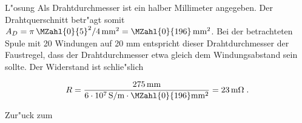 \begin{MExercises}
\begin{MExercise}
\begin{MHint}{L"osung}
Als Drahtdurchmesser ist ein halber Millimeter angegeben. Der Drahtquerschnitt betr"agt somit $A_D=\pi\,\MZahl{0}{5}^2/4\,\text{mm}^2=\MZahl{0}{196}\,\text{mm}^2 $. Bei der betrachteten Spule mit 20 Windungen auf 20 mm entspricht dieser Drahtdurchmesser der Faustregel, dass der Drahtdurchmesser etwa gleich dem Windungsabstand sein sollte. Der Widerstand ist schlie"slich

\begin{equation}
  R=\frac{275\,\text{mm}}{6\cdot 10^7 \,\text{S/m}\cdot \MZahl{0}{196}\text{mm}^2} = 23 \,\text{m}\Omega\; .
\end{equation}

\begin{center}
  \end{center}

\begin{center}
  \end{center}

\end{MHint}

Zur"uck zum 
\end{MExercise}


\end{MExercises}






